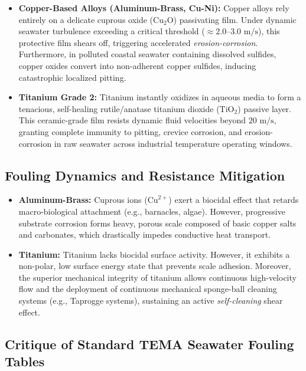 \documentclass[12pt,a4paper]{article}
\begin{document}
\begin{itemize}
    \item \textbf{Copper-Based Alloys (Aluminum-Brass, Cu-Ni):} 
    Copper alloys rely entirely on a delicate cuprous oxide ($\text{Cu}_2\text{O}$) passivating film. Under dynamic seawater turbulence exceeding a critical threshold ($\approx 2.0\text{--}3.0\text{ m/s}$), this protective film shears off, triggering accelerated \textit{erosion-corrosion}. Furthermore, in polluted coastal seawater containing dissolved sulfides, copper oxides convert into non-adherent copper sulfides, inducing catastrophic localized pitting.
    
    \item \textbf{Titanium Grade 2:} 
    Titanium instantly oxidizes in aqueous media to form a tenacious, self-healing rutile/anatase titanium dioxide ($\text{TiO}_2$) passive layer. This ceramic-grade film resists dynamic fluid velocities beyond $20\text{ m/s}$, granting complete immunity to pitting, crevice corrosion, and erosion-corrosion in raw seawater across industrial temperature operating windows.
\end{itemize}

\subsection{Fouling Dynamics and Resistance Mitigation}

\begin{itemize}
    \item \textbf{Aluminum-Brass:} Cuprous ions ($\text{Cu}^{2+}$) exert a biocidal effect that retards macro-biological attachment (e.g., barnacles, algae). However, progressive substrate corrosion forms heavy, porous scale composed of basic copper salts and carbonates, which drastically impedes conductive heat transport.
    
    \item \textbf{Titanium:} Titanium lacks biocidal surface activity. However, it exhibits a non-polar, low surface energy state that prevents scale adhesion. Moreover, the superior mechanical integrity of titanium allows continuous high-velocity flow and the deployment of continuous mechanical sponge-ball cleaning systems (e.g., Taprogge systems), sustaining an active \textit{self-cleaning} shear effect.
\end{itemize}

\subsection{Critique of Standard TEMA Seawater Fouling Tables}
\end{document}
